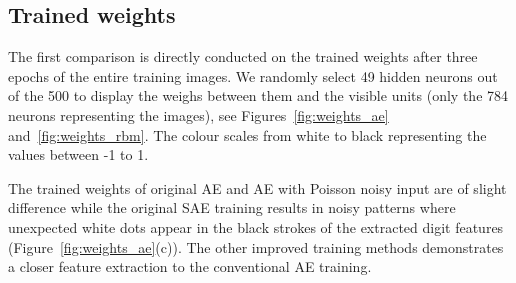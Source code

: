 \subsection{Trained weights}
The first comparison is directly conducted on the trained weights after three epochs of the entire training images.
We randomly select 49 hidden neurons out of the 500 to display the weighs between them and the visible units (only the 784 neurons representing the images), see Figures~\ref{fig:weights_ae} and~\ref{fig:weights_rbm}.
The colour scales from white to black representing the values between -1 to 1.

The trained weights of original AE and AE with Poisson noisy input are of slight difference while the original SAE training results in noisy patterns where unexpected white dots appear in the black strokes of the extracted digit features (Figure~\ref{fig:weights_ae}(c)).
The other improved training methods demonstrates a closer feature extraction to the conventional AE training.

